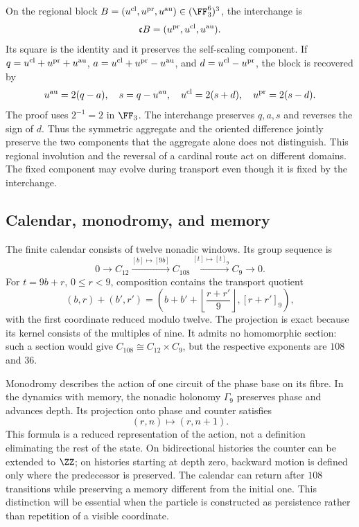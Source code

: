 On the regional block
\(B=(u^{\rm cl},u^{\rm pr},u^{\rm au})\in(\FF_3^6)^3\),
the interchange is
\[
 \mathfrak cB=(u^{\rm pr},u^{\rm cl},u^{\rm au}).
\]
Its square is the identity and it preserves the self-scaling component.
If \(q=u^{\rm cl}+u^{\rm pr}+u^{\rm au}\),
\(a=u^{\rm cl}+u^{\rm pr}-u^{\rm au}\), and
\(d=u^{\rm cl}-u^{\rm pr}\), the block is recovered by
\[
 u^{\rm au}=2(q-a),\quad s=q-u^{\rm au},\quad
 u^{\rm cl}=2(s+d),\quad u^{\rm pr}=2(s-d).
\]
The proof uses \(2^{-1}=2\) in \(\FF_3\). The interchange
preserves \(q,a,s\) and reverses the sign of \(d\). Thus
the symmetric aggregate and the oriented difference jointly preserve
the two components that the aggregate alone does not distinguish.
This regional involution and the reversal of a cardinal route
act on different domains. The fixed component may
evolve during transport even though it is fixed by the interchange.

\subsection{Calendar, monodromy, and memory}

The finite calendar consists of twelve nonadic windows. Its
group sequence is
\begin{equation}
 0\longrightarrow C_{12}\xrightarrow{[b]\mapsto[9b]}C_{108}
 \xrightarrow{[t]\mapsto[t]_9}C_9\longrightarrow0.
 \label{eq:extension108}
\end{equation}
For \(t=9b+r\), \(0\le r<9\), composition contains
the transport quotient
\[
 (b,r)+(b',r')=
 \left(b+b'+\left\lfloor\frac{r+r'}9\right\rfloor,
       [r+r']_9\right),
\]
with the first coordinate reduced modulo twelve. The projection is
exact because its kernel consists of the multiples of nine. It admits no
homomorphic section: such a section would give \(C_{108}\cong C_{12}\times C_9\),
but the respective exponents are \(108\) and \(36\).

Monodromy describes the action of one circuit of the phase base
on its fibre. In the dynamics with memory, the nonadic holonomy
\(\Gamma_9\) preserves phase and advances depth. Its
projection onto phase and counter satisfies
\[
 (r,n)\longmapsto(r,n+1).
\]
This formula is a reduced representation of the action, not a
definition eliminating the rest of the state. On bidirectional
histories the counter can be extended to \(\ZZ\); on
histories starting at depth zero, backward motion is
defined only where the predecessor is preserved. The calendar can
return after \(108\) transitions while preserving a memory
different from the initial one. This distinction will be essential when
the particle is constructed as persistence rather than repetition
of a visible coordinate.


